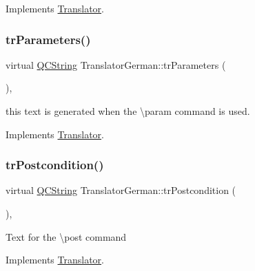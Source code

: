 Implements \mbox{\hyperlink{class_translator}{Translator}}.

\mbox{\label{class_translator_german_a081095d5f6b6193a86566e07c2d75811}} 
\subsubsection{\texorpdfstring{trParameters()}{trParameters()}}
{\footnotesize\ttfamily virtual \mbox{\hyperlink{class_q_c_string}{Q\+C\+String}} Translator\+German\+::tr\+Parameters (\begin{DoxyParamCaption}{ }\end{DoxyParamCaption})\hspace{0.3cm}{\ttfamily [inline]}, {\ttfamily [virtual]}}

this text is generated when the \textbackslash{}param command is used. 

Implements \mbox{\hyperlink{class_translator}{Translator}}.

\mbox{\label{class_translator_german_a740312b0a5d133a15b22e599d78039c6}} 
\subsubsection{\texorpdfstring{trPostcondition()}{trPostcondition()}}
{\footnotesize\ttfamily virtual \mbox{\hyperlink{class_q_c_string}{Q\+C\+String}} Translator\+German\+::tr\+Postcondition (\begin{DoxyParamCaption}{ }\end{DoxyParamCaption})\hspace{0.3cm}{\ttfamily [inline]}, {\ttfamily [virtual]}}

Text for the \textbackslash{}post command 

Implements \mbox{\hyperlink{class_translator}{Translator}}.

\mbox{\label{class_translator_german_a0956dc0b5b39dc2e92476235f52caa68}} 
